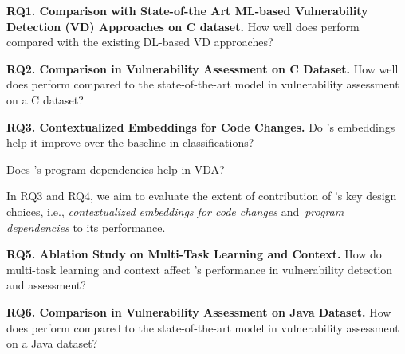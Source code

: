 

\vspace{1pt}
\noindent\textbf{RQ1. Comparison with State-of-the Art ML-based Vulnerability
Detection (VD) Approaches on C dataset.} How well does {\tool} perform
compared with the existing DL-based VD approaches?

\vspace{1pt}
\noindent\textbf{RQ2. Comparison in Vulnerability Assessment on C
  Dataset.} How well does {\tool} perform compared to the
state-of-the-art model in vulnerability assessment on a C dataset?


\noindent\textbf{RQ3. Contextualized Embeddings for Code Changes.} Do {\tool}'s embeddings help it improve over the
baseline in classifications?


 Does {\tool}'s program dependencies help in VDA?

In RQ3 and RQ4, we aim to evaluate the extent of contribution of {\tool}'s key design choices, i.e., {\em contextualized embeddings for code
  changes} and~{\em program dependencies} to its performance.


\noindent\textbf{RQ5. Ablation Study on Multi-Task Learning and Context.} How do multi-task
learning and context affect {\tool}'s performance in vulnerability
detection and assessment?

\vspace{1pt}
\noindent\textbf{RQ6. Comparison in Vulnerability Assessment on Java
  Dataset.} How does {\tool} perform compared to the
state-of-the-art model in vulnerability assessment on a Java dataset?
